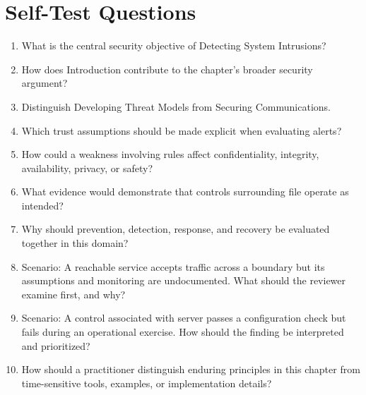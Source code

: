\documentclass[11pt]{article}
\begin{document}
\section*{Self-Test Questions}
\begin{enumerate}
\item What is the central security objective of Detecting System Intrusions?
\item How does Introduction contribute to the chapter's broader security argument?
\item Distinguish Developing Threat Models from Securing Communications.
\item Which trust assumptions should be made explicit when evaluating alerts?
\item How could a weakness involving rules affect confidentiality, integrity, availability, privacy, or safety?
\item What evidence would demonstrate that controls surrounding file operate as intended?
\item Why should prevention, detection, response, and recovery be evaluated together in this domain?
\item Scenario: A reachable service accepts traffic across a boundary but its assumptions and monitoring are undocumented. What should the reviewer examine first, and why?
\item Scenario: A control associated with server passes a configuration check but fails during an operational exercise. How should the finding be interpreted and prioritized?
\item How should a practitioner distinguish enduring principles in this chapter from time-sensitive tools, examples, or implementation details?
\end{enumerate}
\end{document}

